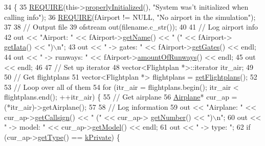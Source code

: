 \begin{DoxyCode}
34                                         \{
35     \hyperlink{DesignByContract_8h_aeb774672b46dbe80afc14e0d1970f017}{REQUIRE}(this->\hyperlink{classSystem_af3eece83ba2d92a4a6b6c186d427c556}{properlyInitialized}(), \textcolor{stringliteral}{"System was't initialized when calling
       info"});
36     \hyperlink{DesignByContract_8h_aeb774672b46dbe80afc14e0d1970f017}{REQUIRE}(fAirport != NULL, \textcolor{stringliteral}{"No airport in the simulation"});
37 
38     \textcolor{comment}{// Output file}
39     ofstream out(filename.c\_str());
40 
41     \textcolor{comment}{// Log airport info}
42     out << \textcolor{stringliteral}{"Airport: "} << fAirport->\hyperlink{classAirport_a9b6eb908a82342b64dda9a72f9369d43}{getName}() << \textcolor{stringliteral}{" ("} << fAirport->
      \hyperlink{classAirport_a4550198ddc92d3583a0f3c31278189b2}{getIata}() << \textcolor{stringliteral}{")\(\backslash\)n"};
43     out << \textcolor{stringliteral}{" -> gates: "} << fAirport->\hyperlink{classAirport_a4d23d65ad0ba4d3878e9e32429dd9286}{getGates}() << endl;
44     out << \textcolor{stringliteral}{" -> runways: "} << fAirport->\hyperlink{classAirport_a587d39bfd3934a70f94b42f40fe72245}{amountOfRunways}() << endl;
45     out << endl;
46 
47     \textcolor{comment}{// Set up iterator}
48     vector<Flightplan *>::iterator itr\_air;
49 
50     \textcolor{comment}{// Get flightplans}
51     vector<Flightplan *> flightplans = \hyperlink{classSystem_a14a06028897516eb4df651220e70ce8f}{getFlightplans}();
52 
53     \textcolor{comment}{// Loop over all of them}
54     \textcolor{keywordflow}{for} (itr\_air = flightplans.begin(); itr\_air < flightplans.end(); ++itr\_air) \{
55         \textcolor{comment}{// Get airplane}
56         \hyperlink{classAirplane}{Airplane}* cur\_ap = (*itr\_air)->getAirplane();
57 
58         \textcolor{comment}{// Log information}
59         out << \textcolor{stringliteral}{"Airplane: "} << cur\_ap->\hyperlink{classAirplane_a6a62bd06d28789336c5ce1543d9391f1}{getCallsign}() << \textcolor{stringliteral}{" ("} << cur\_ap->
      \hyperlink{classAirplane_a2341fbcce9704ffdb81f7638ab74c0cb}{getNumber}() << \textcolor{stringliteral}{")\(\backslash\)n"};
60         out << \textcolor{stringliteral}{" -> model: "} << cur\_ap->\hyperlink{classAirplane_ab3086ab630a7e427df70c7b45f11dd82}{getModel}() << endl;
61         out << \textcolor{stringliteral}{" -> type: "};
62         \textcolor{keywordflow}{if} (cur\_ap->\hyperlink{classAirplane_a6ba13e6c94762127b5b87238f9fbb037}{getType}() == \hyperlink{Airplane_8h_a537b68b9ecaac78d371a35d8cf7604e9a00ca80b4ed05d96bd6ed02aca4b78e1f}{kPrivate}) \{

\end{DoxyCode}
